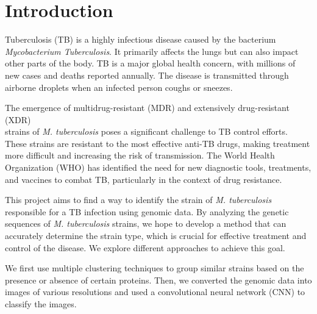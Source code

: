 \chapter{Introduction}
\label{chap:introduction}

Tuberculosis (TB) is a highly infectious disease caused by the bacterium \textit{Mycobacterium Tuberculosis}.
It primarily affects the lungs but can also impact other parts of the body. TB is a major global health concern,
with millions of new cases and deaths reported annually. The disease is transmitted through airborne droplets
when an infected person coughs or sneezes.

The emergence of multidrug-resistant (MDR) and extensively drug-resistant (XDR)\\strains of \textit{M. tuberculosis}
poses a significant challenge to TB control efforts. These strains are resistant to the most effective anti-TB drugs,
making treatment more difficult and increasing the risk of transmission. The World Health Organization (WHO) has
identified the need for new diagnostic tools, treatments, and vaccines to combat TB, particularly in the context of
drug resistance.

This project aims to find a way to identify the strain of \textit{M. tuberculosis} responsible for a TB infection using
genomic data. By analyzing the genetic sequences of \textit{M. tuberculosis} strains, we hope to develop a method that can
accurately determine the strain type, which is crucial for effective treatment and control of the disease. We explore
different approaches to achieve this goal.

We first use multiple clustering techniques to group similar strains based on the presence or absence of certain proteins.
Then, we converted the genomic data into images of various resolutions and used a convolutional neural network (CNN) to
classify the images.
